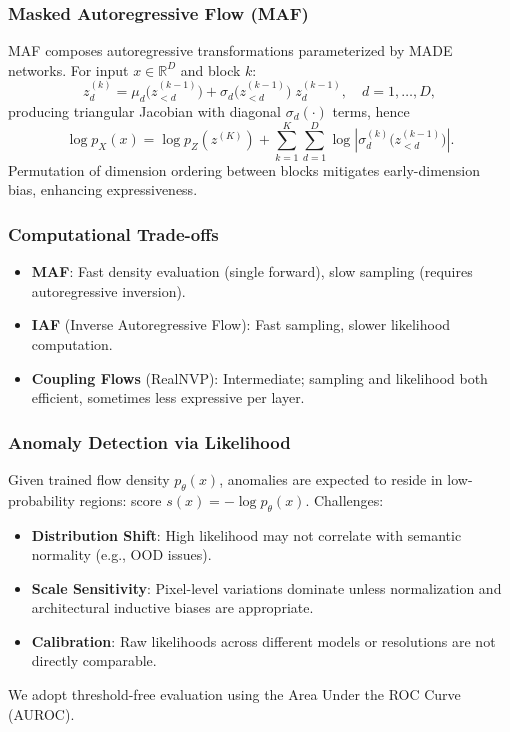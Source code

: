 \documentclass[11pt]{article}
\begin{document}
\subsubsection{Masked Autoregressive Flow (MAF)}
MAF composes autoregressive transformations parameterized by MADE networks. For input $x \in \mathbb{R}^D$ and block $k$:
\begin{equation}
 z^{(k)}_d = \mu_d\big(z^{(k-1)}_{<d}\big) + \sigma_d\big(z^{(k-1)}_{<d}\big) \; z^{(k-1)}_d, \quad d=1,\dots,D,
\end{equation}
producing triangular Jacobian with diagonal $\sigma_d(\cdot)$ terms, hence
\begin{equation}
 \log p_X(x) = \log p_Z(z^{(K)}) + \sum_{k=1}^{K} \sum_{d=1}^{D} \log \left| \sigma^{(k)}_d\big(z^{(k-1)}_{<d}\big) \right|.
\end{equation}
Permutation of dimension ordering between blocks mitigates early-dimension bias, enhancing expressiveness.

\subsubsection{Computational Trade-offs}
\begin{itemize}
 \item \textbf{MAF}: Fast density evaluation (single forward), slow sampling (requires autoregressive inversion).
 \item \textbf{IAF} (Inverse Autoregressive Flow): Fast sampling, slower likelihood computation.
 \item \textbf{Coupling Flows} (RealNVP): Intermediate; sampling and likelihood both efficient, sometimes less expressive per layer.
\end{itemize}

\subsubsection{Anomaly Detection via Likelihood}
Given trained flow density $p_{\theta}(x)$, anomalies are expected to reside in low-probability regions: score $s(x) = -\log p_{\theta}(x)$. Challenges:
\begin{itemize}
 \item \textbf{Distribution Shift}: High likelihood may not correlate with semantic normality (e.g., OOD issues).
 \item \textbf{Scale Sensitivity}: Pixel-level variations dominate unless normalization and architectural inductive biases are appropriate.
 \item \textbf{Calibration}: Raw likelihoods across different models or resolutions are not directly comparable.
\end{itemize}
We adopt threshold-free evaluation using the Area Under the ROC Curve (AUROC).
\end{document}
